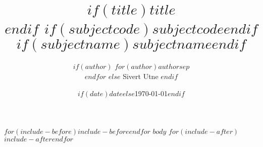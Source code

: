 \documentclass[]{$documentclass$}
\title{
    {\large \supertitle\\\vspace{-1mm}}
    $if(title)$\textbf{$title$}\\\vspace{-1mm}$endif$
    {\color{Gray}\normalsize $if(subjectcode)$$subjectcode$$endif$ $if(subjectname)$$subjectname$$endif$}
}
\author{
$if(author)$
    $for(author)$$author$$sep$ \\ $endfor$
$else$
    Sivert Utne
$endif$
}
\date{$if(date)$$date$$else$\today$endif$}
\begin{document}
    \maketitle

    \vfill
    \tableofcontents 
    \thispagestyle{empty}

    $for(include-before)$$include-before$$endfor$
    \clearpage
    \renewcommand{\arraystretch}{1.3}
    \setcounter{page}{1}
    $body$ %
    $for(include-after)$$include-after$$endfor$
\end{document}
